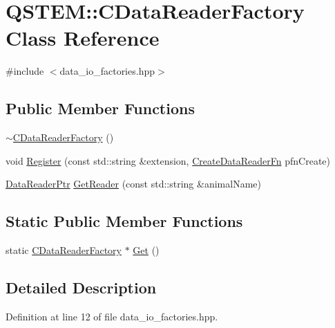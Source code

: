 \hypertarget{class_q_s_t_e_m_1_1_c_data_reader_factory}{\section{Q\-S\-T\-E\-M\-:\-:C\-Data\-Reader\-Factory Class Reference}
\label{class_q_s_t_e_m_1_1_c_data_reader_factory}
}


{\ttfamily \#include $<$data\-\_\-io\-\_\-factories.\-hpp$>$}

\subsection*{Public Member Functions}
\begin{DoxyCompactItemize}
\item 
\hyperlink{class_q_s_t_e_m_1_1_c_data_reader_factory_a6864a14b4527d1590737212b4702d47c}{$\sim$\-C\-Data\-Reader\-Factory} ()
\item 
void \hyperlink{class_q_s_t_e_m_1_1_c_data_reader_factory_ad3a41480fd95cc34784ac1cc555343bc}{Register} (const std\-::string \&extension, \hyperlink{namespace_q_s_t_e_m_a3e396e1b9e670f80ea3a73126fe429a0}{Create\-Data\-Reader\-Fn} pfn\-Create)
\item 
\hyperlink{namespace_q_s_t_e_m_ae38d8cc1829f3379403b3020c44938da}{Data\-Reader\-Ptr} \hyperlink{class_q_s_t_e_m_1_1_c_data_reader_factory_a76c7dd3521506b9c6f2ed868d1eb4f90}{Get\-Reader} (const std\-::string \&animal\-Name)
\end{DoxyCompactItemize}
\subsection*{Static Public Member Functions}
\begin{DoxyCompactItemize}
\item 
static \hyperlink{class_q_s_t_e_m_1_1_c_data_reader_factory}{C\-Data\-Reader\-Factory} $\ast$ \hyperlink{class_q_s_t_e_m_1_1_c_data_reader_factory_a82a7cfabc38ce162874e908c26ab90f9}{Get} ()
\end{DoxyCompactItemize}


\subsection{Detailed Description}


Definition at line 12 of file data\-\_\-io\-\_\-factories.\-hpp.




